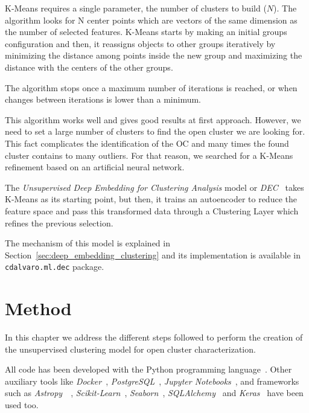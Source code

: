\documentclass[11pt, a4paper, english]{book}
\begin{document}
K-Means requires a single parameter, the number of clusters to build (\(N\)).
The algorithm looks for N center points which are vectors of the same dimension as the number of selected features.
K-Means starts by making an initial groups configuration and then,
it reassigns objects to other groups iteratively by minimizing the distance among points
inside the new group and maximizing the distance with the centers of the other groups.

The algorithm stops once a maximum number of iterations is reached,
or when changes between iterations is lower than a minimum.

This algorithm works well and gives good results at first approach.
However, we need to set a large number of clusters to find the open cluster we are looking for.
This fact complicates the identification of the OC and many times the found cluster contains to many outliers.
For that reason, we searched for a K-Means refinement based on an artificial neural network.

The \emph{Unsupervised Deep Embedding for Clustering Analysis} model
or \emph{DEC}~\cite{xie2016unsupervised} takes K-Means as its starting point,
but then, it trains an autoencoder to reduce the feature space
and pass this transformed data through a Clustering Layer which refines the previous selection.

The mechanism of this model is explained in Section~\ref{sec:deep_embedding_clustering}
and its implementation is available in \verb|cdalvaro.ml.dec| package.

\chapter{Method}
\label{chap:method}

In this chapter we address the different steps followed to perform the creation of
the unsupervised clustering model for open cluster characterization.

All code has been developed with the Python programming language~\cite{Python3}.
Other auxiliary tools like \emph{Docker}~\cite{merkel2014docker},
\emph{PostgreSQL}~\cite{postgresql}, \emph{Jupyter Notebooks}~\cite{Kluyver2016jupyter},
and frameworks such as \emph{Astropy}~\cite{astropy:2013}~\cite{astropy:2018},
\emph{Scikit-Learn}~\cite{scikit-learn}, \emph{Seaborn}~\cite{michael_waskom_2017_883859},
\emph{SQLAlchemy}~\cite{sqlalchemy} and \emph{Keras}~\cite{chollet2015keras} have been used too.
\end{document}

